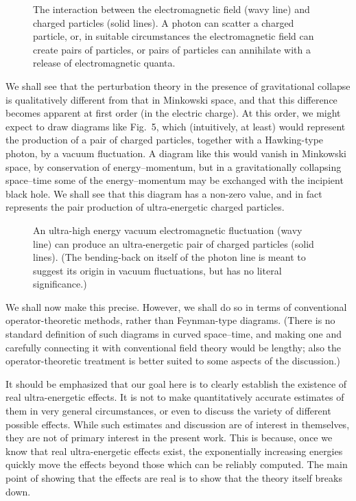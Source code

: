 \documentclass[12pt]{article}
\begin{document}
\begin{figure}
\epsfxsize=1in
\caption{The interaction between the electromagnetic field (wavy line) and
charged particles (solid lines).  A photon can scatter a charged particle, or,
in suitable circumstances the electromagnetic field can create pairs of
particles, or pairs of particles can annihilate with a release of 
electromagnetic quanta.
}
\end{figure}

We shall see that the perturbation theory in the presence of
gravitational collapse is qualitatively different from that in
Minkowski space, and that this difference becomes apparent at first
order (in the electric charge).  At this order, we might expect to
draw diagrams like Fig.~5, which (intuitively, at least) would
represent the production of a pair of charged particles,
together with a Hawking-type photon, by a vacuum fluctuation.
A diagram like this would vanish in Minkowski space, by conservation
of energy--momentum, but in a gravitationally collapsing space--time
some of the energy--momentum may be exchanged with the incipient black
hole.  We shall see that this diagram has a non-zero value, and in
fact represents the pair production of ultra-energetic charged
particles.

\begin{figure}
\epsfxsize=2in
\caption{An ultra-high energy vacuum electromagnetic fluctuation (wavy
line) can produce an ultra-energetic pair of charged particles
(solid lines).  (The bending-back on itself of the photon line is meant to
suggest its origin in vacuum fluctuations, but has no
literal significance.)
}
\end{figure}

We shall now make this precise.  However, we shall do so in terms of
conventional operator-theoretic methods, rather than Feynman-type diagrams. 
(There is no standard definition of such diagrams in curved space--time, and
making one and carefully connecting it with conventional field theory would be
lengthy; also the operator-theoretic treatment is better suited to some aspects
of the discussion.)

It should be emphasized that our goal here is to clearly establish the existence
of real ultra-energetic effects.  It is not to make quantitatively accurate
estimates of them in very general circumstances, or even to discuss the variety
of different possible effects.  While such estimates and
discussion are of interest in themselves, they are not of primary interest in
the present work.  This is because, once we know that real ultra-energetic
effects exist, the exponentially increasing energies quickly move the effects
beyond those which can be reliably computed.  The main point of showing that the
effects are real is to show that the theory itself breaks down.
\end{document}

